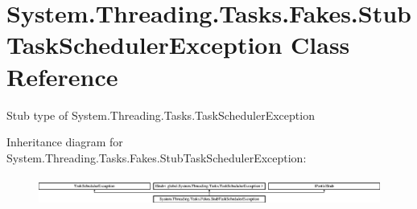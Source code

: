 \hypertarget{class_system_1_1_threading_1_1_tasks_1_1_fakes_1_1_stub_task_scheduler_exception}{\section{System.\-Threading.\-Tasks.\-Fakes.\-Stub\-Task\-Scheduler\-Exception Class Reference}
\label{class_system_1_1_threading_1_1_tasks_1_1_fakes_1_1_stub_task_scheduler_exception}
}


Stub type of System.\-Threading.\-Tasks.\-Task\-Scheduler\-Exception 


Inheritance diagram for System.\-Threading.\-Tasks.\-Fakes.\-Stub\-Task\-Scheduler\-Exception\-:\begin{figure}[H]
\begin{center}
\leavevmode
\includegraphics[height=0.957265cm]{class_system_1_1_threading_1_1_tasks_1_1_fakes_1_1_stub_task_scheduler_exception}
\end{center}
\end{figure}
